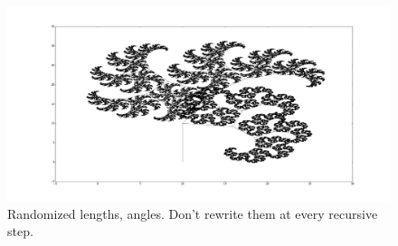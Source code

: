 \documentclass[12pt]{article}\pagestyle{myheadings}
\theoremstyle{plain}
\begin{document}
\begin{figure}[H]
\centering
\includegraphics[scale=.15]{random_no_rewrite}
\caption{Randomized lengths, angles. Don't rewrite them at every recursive step.}
\label{fig:my_label}
\end{figure}
\end{document}
